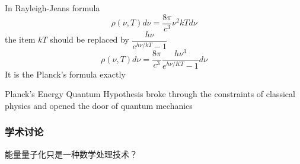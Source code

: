 \begin{frame}
    In Rayleigh-Jeans formula
    \begin{equation*}
        \rho(\nu, T) d \nu=\frac{8 \pi}{c^{3}} \nu^{2} k T d \nu 
    \end{equation*}
    the item $kT$ should be replaced by $\dfrac{h \nu}{e^{ h \nu / k T}-1}$
    \begin{equation*}
        \rho(\nu, T) d \nu=\frac{8 \pi}{c^{3}} \frac{h \nu^{3}}{e^{h \nu / K T}-1} d \nu
    \end{equation*}
    It is the Planck's formula exactly 
\end{frame}

\begin{frame}
    \begin{tcolorbox3}
        Planck's Energy Quantum Hypothesis broke through the constraints of classical physics and 
        opened the door of quantum mechanics 
    \end{tcolorbox3}
\end{frame}

\begin{frame}
    \frametitle{}
    \centering
  \end{frame}


\begin{frame}
    \frametitle{学术讨论}
    \begin{center}
        {\color{red} \Large 能量量子化只是一种数学处理技术？}  
    \end{center}
\end{frame}
